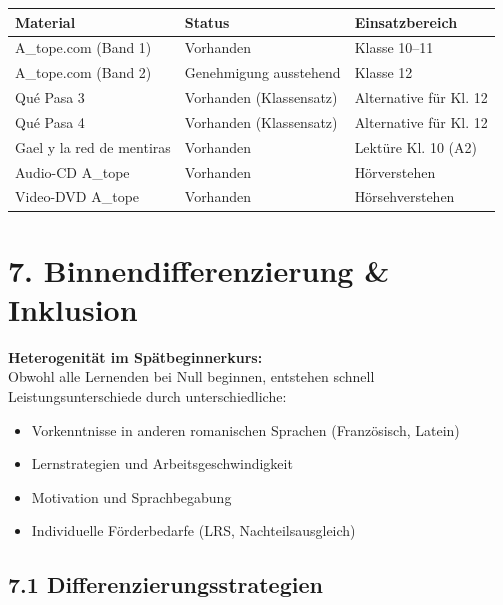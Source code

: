 \documentclass[11pt, a4paper]{article}
\begin{document}
\begin{tabularx}{\textwidth}{|L{4cm}|L{3cm}|X|}
\hline
{}
\textbf{Material} & \textbf{Status} & \textbf{Einsatzbereich} \\
\hline
A\_tope.com (Band 1) & Vorhanden & Klasse 10--11 \\
\hline
A\_tope.com (Band 2) & \textcolor{jahr12}{Genehmigung ausstehend} & Klasse 12 \\
\hline
Qué Pasa 3 & Vorhanden (Klassensatz) & Alternative für Kl. 12 \\
\hline
Qué Pasa 4 & Vorhanden (Klassensatz) & Alternative für Kl. 12 \\
\hline
Gael y la red de mentiras & Vorhanden & Lektüre Kl. 10 (A2) \\
\hline
Audio-CD A\_tope & Vorhanden & Hörverstehen \\
\hline
Video-DVD A\_tope & Vorhanden & Hörsehverstehen \\
\hline
\end{tabularx}


\section*{7. Binnendifferenzierung \& Inklusion}

\begin{infobox}
\textbf{Heterogenität im Spätbeginnerkurs:}\\[4pt]
Obwohl alle Lernenden bei Null beginnen, entstehen schnell Leistungsunterschiede durch unterschiedliche:
\begin{itemize}[leftmargin=1.5em, itemsep=2pt]
    \item Vorkenntnisse in anderen romanischen Sprachen (Französisch, Latein)
    \item Lernstrategien und Arbeitsgeschwindigkeit
    \item Motivation und Sprachbegabung
    \item Individuelle Förderbedarfe (LRS, Nachteilsausgleich)
\end{itemize}
\end{infobox}

\subsection*{7.1 Differenzierungsstrategien}
\end{document}

